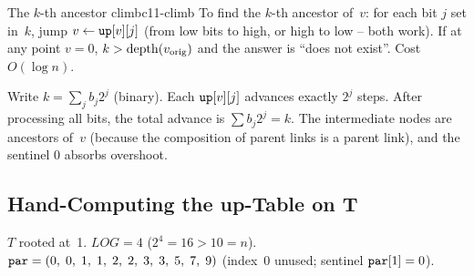 \begin{proposition}{The \(k\)-th ancestor climb}{c11-climb}
To find the \(k\)-th ancestor of~\(v\): for each bit \(j\) set in~\(k\),
jump \(v \leftarrow \texttt{up}[v][j]\) (from low bits to high, or high to
low -- both work).  If at any point \(v = 0\), \(k > \operatorname{depth}(v_{\text{orig}})\)
and the answer is ``does not exist''.  Cost \(O(\log n)\).
\end{proposition}

\begin{proofbox}
Write \(k = \sum_{j} b_j 2^j\) (binary).  Each \(\texttt{up}[v][j]\) advances
exactly \(2^j\) steps.  After processing all bits, the total advance is
\(\sum b_j 2^j = k\).  The intermediate nodes are ancestors of~\(v\)
(because the composition of parent links is a parent link), and the
sentinel \(0\) absorbs overshoot.
\end{proofbox}

\subsection{Hand-Computing the up-Table on T}

\(T\) rooted at~1.  \(\mathit{LOG} = 4\) (\(2^4 = 16 > 10 = n\)).
\(\texttt{par} = (0,\;0,\;1,\;1,\;2,\;2,\;3,\;3,\;5,\;7,\;9)\) (index~0
unused; sentinel \(\texttt{par}[1]=0\)).

